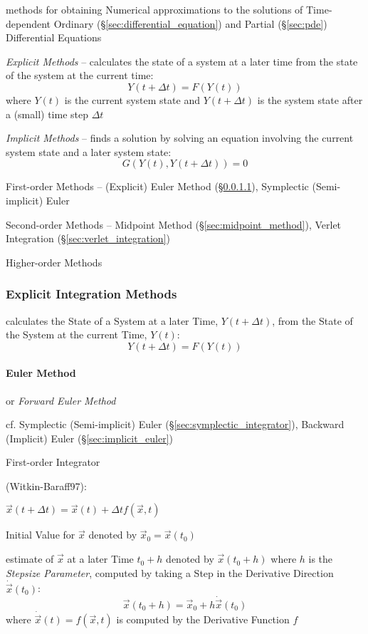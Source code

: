 methods for obtaining Numerical approximations to the solutions of
Time-dependent Ordinary (\S\ref{sec:differential_equation}) and Partial
(\S\ref{sec:pde}) Differential Equations

\emph{Explicit Methods} -- calculates the state of a system at a later time
from the state of the system at the current time:
\[
  Y(t+\Delta{t}) = F(Y(t))
\]
where $Y(t)$ is the current system state and $Y(t + \Delta{t})$ is the system
state after a (small) time step $\Delta{t}$

\emph{Implicit Methods} -- finds a solution by solving an equation involving
the current system state and a later system state:
\[
  G(Y(t), Y(t + \Delta{t})) = 0
\]

First-order Methods -- (Explicit) Euler Method (\S\ref{sec:euler_method}),
Symplectic (Semi-implicit) Euler

Second-order Methods -- Midpoint Method (\S\ref{sec:midpoint_method}), Verlet
Integration (\S\ref{sec:verlet_integration})

Higher-order Methods



\subsubsection{Explicit Integration Methods}\label{sec:explicit_integration}

calculates the State of a System at a later Time, $Y(t + \Delta{t})$, from the
State of the System at the current Time, $Y(t)$:
\[
  Y(t + \Delta{t}) = F(Y(t))
\]



\paragraph{Euler Method}\label{sec:euler_method}\hfill

or \emph{Forward Euler Method}

\fist cf. Symplectic (Semi-implicit) Euler (\S\ref{sec:symplectic_integrator}),
Backward (Implicit) Euler (\S\ref{sec:implicit_euler})

First-order Integrator

(Witkin-Baraff97):

$\vec{x}(t + \Delta{t}) = \vec{x}(t) + \Delta{t}f(\vec{x},t)$

Initial Value for $\vec{x}$ denoted by $\vec{x}_0 = \vec{x}(t_0)$

estimate of $\vec{x}$ at a later Time $t_0 + h$ denoted by $\vec{x}(t_0 + h)$
where $h$ is the \emph{Stepsize Parameter}, computed by taking a Step in the
Derivative Direction $\dot{\vec{x}}(t_0)$:
\[
  \vec{x}(t_0 + h) = \vec{x}_0 + h\dot{\vec{x}}(t_0)
\]
where $\dot{\vec{x}}(t) = f(\vec{x}, t)$ is computed by the Derivative Function
$f$

